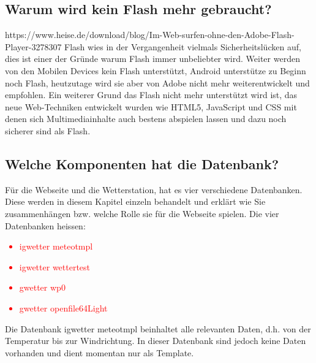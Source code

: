 \documentclass[a4paper,ngerman, 12pt]{report}
\newcommand\Diskussionspunkt[1]{\textcolor{red}{#1}}
\begin{document}
\subsection{Warum wird kein Flash mehr gebraucht?}
  
https://www.heise.de/download/blog/Im-Web-surfen-ohne-den-Adobe-Flash-Player-3278307
Flash wies in der Vergangenheit vielmals Sicherheitslücken auf, dies ist einer der Gründe warum Flash immer unbeliebter wird. Weiter werden von den Mobilen Devices kein Flash unterstützt, Android unterstütze zu Beginn noch Flash, heutzutage wird sie aber von Adobe nicht mehr weiterentwickelt und empfohlen. Ein weiterer Grund das Flash nicht mehr unterstützt wird ist, das neue Web-Techniken entwickelt wurden wie HTML5, JavaScript und CSS mit denen sich Multimediainhalte auch bestens abspielen lassen und dazu noch sicherer sind als Flash.

\subsection{Welche Komponenten hat die Datenbank?}
Für die Webseite und die Wetterstation, hat es vier verschiedene Datenbanken. Diese werden in diesem Kapitel einzeln behandelt und erklärt wie Sie zusammenhängen bzw. welche Rolle sie für die Webseite spielen. Die vier Datenbanken heissen:
\Diskussionspunkt{
\begin{itemize}  
\item igwetter meteotmpl
\item igwetter wettertest
\item gwetter wp0
\item gwetter openfile64Light
\end{itemize}
}

Die Datenbank igwetter meteotmpl beinhaltet alle relevanten Daten, d.h. von der Temperatur bis zur Windrichtung. In dieser Datenbank sind jedoch keine Daten vorhanden und dient momentan nur als Template.\\
\end{document}

